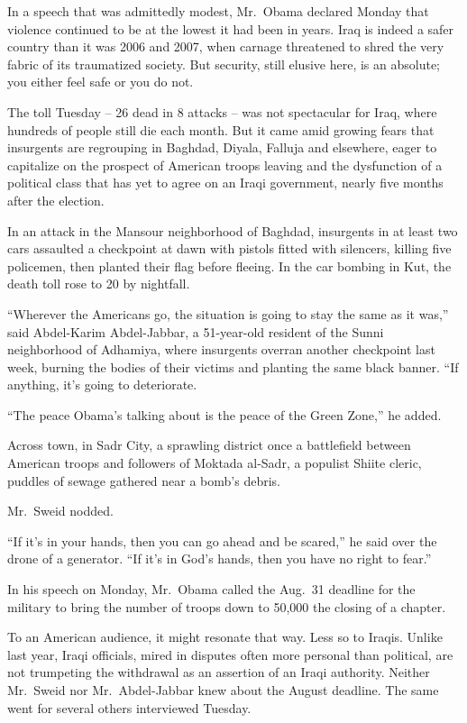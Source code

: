 ﻿\documentclass[12pt]{article}
\begin{document}
In a speech that was admittedly modest, Mr.~Obama declared Monday that violence continued to be at
the lowest it had been in years. Iraq is indeed a safer country than it was 2006 and 2007, when
carnage threatened to shred the very fabric of its traumatized society. But security, still elusive
here, is an absolute; you either feel safe or you do not.

The toll Tuesday -- 26 dead in 8 attacks -- was not spectacular for Iraq, where hundreds of people
still die each month. But it came amid growing fears that insurgents are regrouping in Baghdad,
Diyala, Falluja and elsewhere, eager to capitalize on the prospect of American troops leaving and
the dysfunction of a political class that has yet to agree on an Iraqi government, nearly five
months after the election.

In an attack in the Mansour neighborhood of Baghdad, insurgents in at least two cars assaulted a
checkpoint at dawn with pistols fitted with silencers, killing five policemen, then planted their
flag before fleeing. In the car bombing in Kut, the death toll rose to 20 by nightfall.

``Wherever the Americans go, the situation is going to stay the same as it was,'' said Abdel-Karim
Abdel-Jabbar, a 51-year-old resident of the Sunni neighborhood of Adhamiya, where insurgents overran
another checkpoint last week, burning the bodies of their victims and planting the same black
banner. ``If anything, it's going to deteriorate.

``The peace Obama's talking about is the peace of the Green Zone,'' he added.

Across town, in Sadr City, a sprawling district once a battlefield between American troops and
followers of Moktada al-Sadr, a populist Shiite cleric, puddles of sewage gathered near a bomb's
debris.

Mr.~Sweid nodded.

``If it's in your hands, then you can go ahead and be scared,'' he said over the drone of a
generator. ``If it's in God's hands, then you have no right to fear.''

In his speech on Monday, Mr.~Obama called the Aug.~31 deadline for the military to bring the number
of troops down to 50,000 the closing of a chapter.

To an American audience, it might resonate that way. Less so to Iraqis. Unlike last year, Iraqi
officials, mired in disputes often more personal than political, are not trumpeting the withdrawal
as an assertion of an Iraqi authority. Neither Mr.~Sweid nor Mr.~Abdel-Jabbar knew about the August
deadline. The same went for several others interviewed Tuesday.
\end{document}

